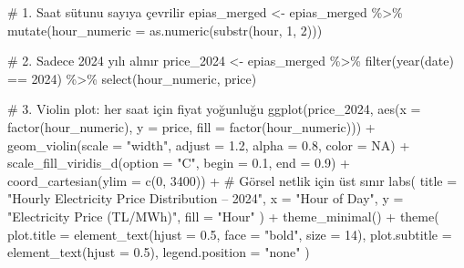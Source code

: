 \documentclass[
]{article}
\newenvironment{Shaded}{\begin{snugshade}}{\end{snugshade}}
\newcommand{\AttributeTok}[1]{\textcolor[rgb]{0.40,0.45,0.13}{#1}}
\newcommand{\CommentTok}[1]{\textcolor[rgb]{0.37,0.37,0.37}{#1}}
\newcommand{\ConstantTok}[1]{\textcolor[rgb]{0.56,0.35,0.01}{#1}}
\newcommand{\DecValTok}[1]{\textcolor[rgb]{0.68,0.00,0.00}{#1}}
\newcommand{\FloatTok}[1]{\textcolor[rgb]{0.68,0.00,0.00}{#1}}
\newcommand{\FunctionTok}[1]{\textcolor[rgb]{0.28,0.35,0.67}{#1}}
\newcommand{\NormalTok}[1]{\textcolor[rgb]{0.00,0.23,0.31}{#1}}
\newcommand{\OtherTok}[1]{\textcolor[rgb]{0.00,0.23,0.31}{#1}}
\newcommand{\SpecialCharTok}[1]{\textcolor[rgb]{0.37,0.37,0.37}{#1}}
\newcommand{\StringTok}[1]{\textcolor[rgb]{0.13,0.47,0.30}{#1}}
\begin{document}
\begin{Shaded}
\begin{Highlighting}[]
\CommentTok{\# 1. Saat sütunu sayıya çevrilir}
\NormalTok{epias\_merged }\OtherTok{\textless{}{-}}\NormalTok{ epias\_merged }\SpecialCharTok{\%\textgreater{}\%}
  \FunctionTok{mutate}\NormalTok{(}\AttributeTok{hour\_numeric =} \FunctionTok{as.numeric}\NormalTok{(}\FunctionTok{substr}\NormalTok{(hour, }\DecValTok{1}\NormalTok{, }\DecValTok{2}\NormalTok{)))}

\CommentTok{\# 2. Sadece 2024 yılı alınır}
\NormalTok{price\_2024 }\OtherTok{\textless{}{-}}\NormalTok{ epias\_merged }\SpecialCharTok{\%\textgreater{}\%}
  \FunctionTok{filter}\NormalTok{(}\FunctionTok{year}\NormalTok{(date) }\SpecialCharTok{==} \DecValTok{2024}\NormalTok{) }\SpecialCharTok{\%\textgreater{}\%}
  \FunctionTok{select}\NormalTok{(hour\_numeric, price)}

\CommentTok{\# 3. Violin plot: her saat için fiyat yoğunluğu}
\FunctionTok{ggplot}\NormalTok{(price\_2024, }\FunctionTok{aes}\NormalTok{(}\AttributeTok{x =} \FunctionTok{factor}\NormalTok{(hour\_numeric), }\AttributeTok{y =}\NormalTok{ price, }\AttributeTok{fill =} \FunctionTok{factor}\NormalTok{(hour\_numeric))) }\SpecialCharTok{+}
  \FunctionTok{geom\_violin}\NormalTok{(}\AttributeTok{scale =} \StringTok{"width"}\NormalTok{, }\AttributeTok{adjust =} \FloatTok{1.2}\NormalTok{, }\AttributeTok{alpha =} \FloatTok{0.8}\NormalTok{, }\AttributeTok{color =} \ConstantTok{NA}\NormalTok{) }\SpecialCharTok{+}
  \FunctionTok{scale\_fill\_viridis\_d}\NormalTok{(}\AttributeTok{option =} \StringTok{"C"}\NormalTok{, }\AttributeTok{begin =} \FloatTok{0.1}\NormalTok{, }\AttributeTok{end =} \FloatTok{0.9}\NormalTok{) }\SpecialCharTok{+}
  \FunctionTok{coord\_cartesian}\NormalTok{(}\AttributeTok{ylim =} \FunctionTok{c}\NormalTok{(}\DecValTok{0}\NormalTok{, }\DecValTok{3400}\NormalTok{)) }\SpecialCharTok{+}  \CommentTok{\# Görsel netlik için üst sınır}
  \FunctionTok{labs}\NormalTok{(}
    \AttributeTok{title =} \StringTok{"Hourly Electricity Price Distribution – 2024"}\NormalTok{,}
    \AttributeTok{x =} \StringTok{"Hour of Day"}\NormalTok{,}
    \AttributeTok{y =} \StringTok{"Electricity Price (TL/MWh)"}\NormalTok{,}
    \AttributeTok{fill =} \StringTok{"Hour"}
\NormalTok{  ) }\SpecialCharTok{+}
  \FunctionTok{theme\_minimal}\NormalTok{() }\SpecialCharTok{+}
  \FunctionTok{theme}\NormalTok{(}
    \AttributeTok{plot.title =} \FunctionTok{element\_text}\NormalTok{(}\AttributeTok{hjust =} \FloatTok{0.5}\NormalTok{, }\AttributeTok{face =} \StringTok{"bold"}\NormalTok{, }\AttributeTok{size =} \DecValTok{14}\NormalTok{),}
    \AttributeTok{plot.subtitle =} \FunctionTok{element\_text}\NormalTok{(}\AttributeTok{hjust =} \FloatTok{0.5}\NormalTok{),}
    \AttributeTok{legend.position =} \StringTok{"none"}
\NormalTok{  )}
\end{Highlighting}
\end{Shaded}
\end{document}
